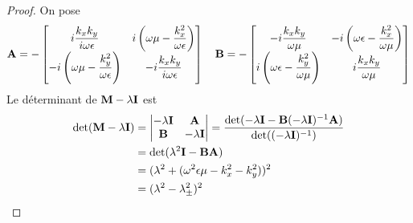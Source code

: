     \begin{proof}
        On pose 
        \begin{equation*}
            \mathbf{A} = -\begin{bmatrix}
                i\dfrac{k_xk_y}{i\omega\epsilon} & i\left(\omega\mu - \dfrac{k_x^2}{\omega\epsilon}\right) \\
                -i\left(\omega\mu - \dfrac{k_y^2}{\omega\epsilon}\right) & -i\dfrac{k_xk_y}{i\omega\epsilon} \\
            \end{bmatrix}
            \quad
            \mathbf{B} = -\begin{bmatrix}
                -i\dfrac{k_xk_y}{\omega\mu} & -i\left(\omega\epsilon - \dfrac{k_x^2}{\omega\mu}\right) \\
                i\left(\omega\epsilon - \dfrac{k_y^2}{\omega\mu}\right) & i\dfrac{k_xk_y}{\omega\mu} \\
            \end{bmatrix}
        \end{equation*}
        Le déterminant de $\mathbf{M}-\lambda \mathbf{I}$ est
        \begin{align*}
            \det(\mathbf{M}-\lambda \mathbf{I}) &= 
            \begin{vmatrix}
                -\lambda \mathbf{I} & \mathbf{A} \\
                \mathbf{B} & -\lambda \mathbf{I}
            \end{vmatrix}
                = \dfrac{\det(- \lambda \mathbf{I} - \mathbf{B}(-\lambda \mathbf{I})^{-1} \mathbf{A})}{\det((-\lambda \mathbf{I})^{-1})} \\
                &= \det(\lambda^2 \mathbf{I} - \mathbf{B}\mathbf{A}) \\
                &= (\lambda^2 + (\omega^2\epsilon\mu - k_x^2 -k_y^2))^2 \\
                &= (\lambda^2 - \lambda_\pm^2)^2
        \end{align*}



\end{proof}
